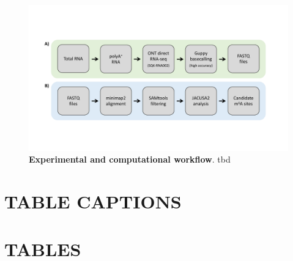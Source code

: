\documentclass[times, 11pt, a4paper]{article}
\begin{document}
\begin{figure}[h!]
    \includegraphics[width = 1\textwidth]{Figure3.pdf}
  \caption{\textbf{Experimental and computational workflow}. tbd}
  \label{fig:workflow}
      \end{figure}
\newpage



\section*{TABLE CAPTIONS}
\section*{TABLES}
\end{document}
